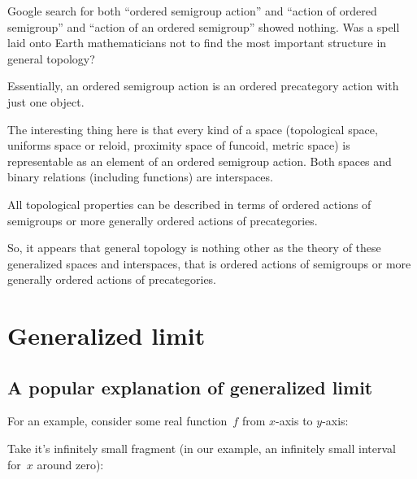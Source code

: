\documentclass{amsart}
\begin{document}
\begin{rem}
Google search for both ``ordered semigroup action'' and ``action of ordered semigroup'' and ``action of an ordered semigroup'' showed nothing. Was a spell laid onto Earth mathematicians not to find the most important structure in general topology?
\end{rem}

Essentially, an ordered semigroup action is an ordered precategory action with just one object.

The interesting thing here is that every kind of a space
(topological space, uniforms space or reloid, proximity space
of funcoid, metric space) is representable as an element of
an ordered semigroup action. Both spaces and binary relations
(including functions) are interspaces.

All topological properties can be described in terms of
ordered actions of semigroups or more generally ordered actions of precategories.

So, it appears that general topology is nothing other as the
theory of these generalized spaces and interspaces, that is
ordered actions of semigroups or more generally ordered actions of precategories.

\section{Generalized limit}

\subsection{A popular explanation of generalized limit}

For an example, consider some real function~$f$ from $x$-axis to $y$-axis:
\begin{figure}[H]
\end{figure}
 
Take it's infinitely small fragment (in our example, an infinitely small interval for~$x$ around zero):
\begin{figure}[H]
\end{figure}
\end{document}
